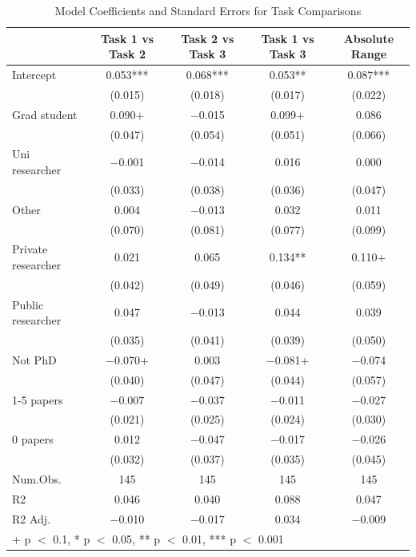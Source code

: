 \documentclass[
  letterpaper,
  DIV=11,
  numbers=noendperiod]{scrartcl}
\begin{document}
\begin{table}
\centering
\caption{Model Coefficients and Standard Errors for Task Comparisons\label{tab-researcher-characteristics-regs-b}}
\centering
\begin{tabular}[t]{lcccc}
\toprule
  & Task 1 vs Task 2 & Task 2 vs Task 3 & Task 1 vs Task 3 & Absolute Range\\
\midrule
Intercept & \num{0.053}*** & \num{0.068}*** & \num{0.053}** & \num{0.087}***\\
 & (\num{0.015}) & (\num{0.018}) & (\num{0.017}) & (\num{0.022})\\
Grad student & \num{0.090}+ & \num{-0.015} & \num{0.099}+ & \num{0.086}\\
 & (\num{0.047}) & (\num{0.054}) & (\num{0.051}) & (\num{0.066})\\
Uni researcher & \num{-0.001} & \num{-0.014} & \num{0.016} & \num{0.000}\\
 & (\num{0.033}) & (\num{0.038}) & (\num{0.036}) & (\num{0.047})\\
Other & \num{0.004} & \num{-0.013} & \num{0.032} & \num{0.011}\\
 & (\num{0.070}) & (\num{0.081}) & (\num{0.077}) & (\num{0.099})\\
Private researcher & \num{0.021} & \num{0.065} & \num{0.134}** & \num{0.110}+\\
 & (\num{0.042}) & (\num{0.049}) & (\num{0.046}) & (\num{0.059})\\
Public researcher & \num{0.047} & \num{-0.013} & \num{0.044} & \num{0.039}\\
 & (\num{0.035}) & (\num{0.041}) & (\num{0.039}) & (\num{0.050})\\
Not PhD & \num{-0.070}+ & \num{0.003} & \num{-0.081}+ & \num{-0.074}\\
 & (\num{0.040}) & (\num{0.047}) & (\num{0.044}) & (\num{0.057})\\
1-5 papers & \num{-0.007} & \num{-0.037} & \num{-0.011} & \num{-0.027}\\
 & (\num{0.021}) & (\num{0.025}) & (\num{0.024}) & (\num{0.030})\\
0 papers & \num{0.012} & \num{-0.047} & \num{-0.017} & \num{-0.026}\\
 & (\num{0.032}) & (\num{0.037}) & (\num{0.035}) & (\num{0.045})\\
\midrule
Num.Obs. & \num{145} & \num{145} & \num{145} & \num{145}\\
R2 & \num{0.046} & \num{0.040} & \num{0.088} & \num{0.047}\\
R2 Adj. & \num{-0.010} & \num{-0.017} & \num{0.034} & \num{-0.009}\\
\bottomrule
\multicolumn{5}{l}{\rule{0pt}{1em}+ p $<$ 0.1, * p $<$ 0.05, ** p $<$ 0.01, *** p $<$ 0.001}\\
\end{tabular}
\end{table}
\end{document}
